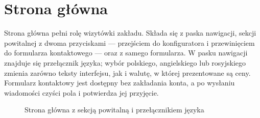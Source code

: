 \section{Strona główna}
\label{sec:prez-strona-glowna}

Strona główna pełni rolę wizytówki zakładu. Składa się z paska nawigacji, sekcji powitalnej z dwoma przyciskami — przejściem do konfiguratora i przewinięciem do formularza kontaktowego — oraz z samego formularza. W pasku nawigacji znajduje się przełącznik języka; wybór polskiego, angielskiego lub rosyjskiego zmienia zarówno teksty interfejsu, jak i walutę, w której prezentowane są ceny. Formularz kontaktowy jest dostępny bez zakładania konta, a po wysłaniu wiadomości czyści pola i potwierdza jej przyjęcie.

\begin{figure}[htbp]
\centering
\caption{Strona główna z sekcją powitalną i przełącznikiem języka}
\label{fig:prez-strona-glowna}
\end{figure}

